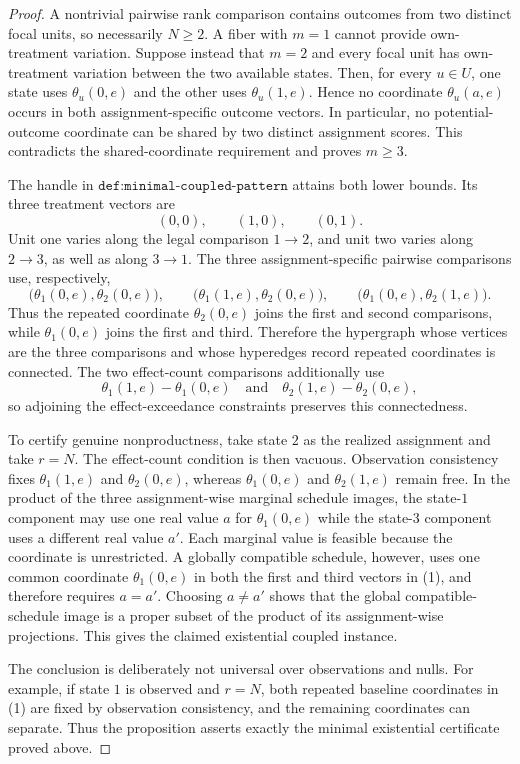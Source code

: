 \documentclass{article}
\begin{document}
\begin{proof}
A nontrivial pairwise rank comparison contains outcomes from two distinct focal units, so necessarily \(N\geq2\).  A fiber with \(m=1\) cannot provide own-treatment variation.  Suppose instead that \(m=2\) and every focal unit has own-treatment variation between the two available states.  Then, for every \(u\in U\), one state uses \(\theta_u(0,e)\) and the other uses \(\theta_u(1,e)\).  Hence no coordinate \(\theta_u(a,e)\) occurs in both assignment-specific outcome vectors.  In particular, no potential-outcome coordinate can be shared by two distinct assignment scores.  This contradicts the shared-coordinate requirement and proves \(m\geq3\).

The handle in \(\texttt{def:minimal-coupled-pattern}\) attains both lower bounds.  Its three treatment vectors are
\[
 (0,0),\qquad(1,0),\qquad(0,1).
\]
Unit one varies along the legal comparison \(1\to2\), and unit two varies along \(2\to3\), as well as along \(3\to1\).  The three assignment-specific pairwise comparisons use, respectively,
\[
 \bigl(\theta_1(0,e),\theta_2(0,e)\bigr),\qquad
 \bigl(\theta_1(1,e),\theta_2(0,e)\bigr),\qquad
 \bigl(\theta_1(0,e),\theta_2(1,e)\bigr).
\tag{1}
\]
Thus the repeated coordinate \(\theta_2(0,e)\) joins the first and second comparisons, while \(\theta_1(0,e)\) joins the first and third.  Therefore the hypergraph whose vertices are the three comparisons and whose hyperedges record repeated coordinates is connected.  The two effect-count comparisons additionally use
\[
 \theta_1(1,e)-\theta_1(0,e)
 \quad\text{and}\quad
 \theta_2(1,e)-\theta_2(0,e),
\]
so adjoining the effect-exceedance constraints preserves this connectedness.

To certify genuine nonproductness, take state \(2\) as the realized assignment and take \(r=N\).  The effect-count condition is then vacuous.  Observation consistency fixes \(\theta_1(1,e)\) and \(\theta_2(0,e)\), whereas \(\theta_1(0,e)\) and \(\theta_2(1,e)\) remain free.  In the product of the three assignment-wise marginal schedule images, the state-\(1\) component may use one real value \(a\) for \(\theta_1(0,e)\) while the state-\(3\) component uses a different real value \(a'\).  Each marginal value is feasible because the coordinate is unrestricted.  A globally compatible schedule, however, uses one common coordinate \(\theta_1(0,e)\) in both the first and third vectors in (1), and therefore requires \(a=a'\).  Choosing \(a\neq a'\) shows that the global compatible-schedule image is a proper subset of the product of its assignment-wise projections.  This gives the claimed existential coupled instance.

The conclusion is deliberately not universal over observations and nulls.  For example, if state \(1\) is observed and \(r=N\), both repeated baseline coordinates in (1) are fixed by observation consistency, and the remaining coordinates can separate.  Thus the proposition asserts exactly the minimal existential certificate proved above.
\end{proof}
\end{document}
